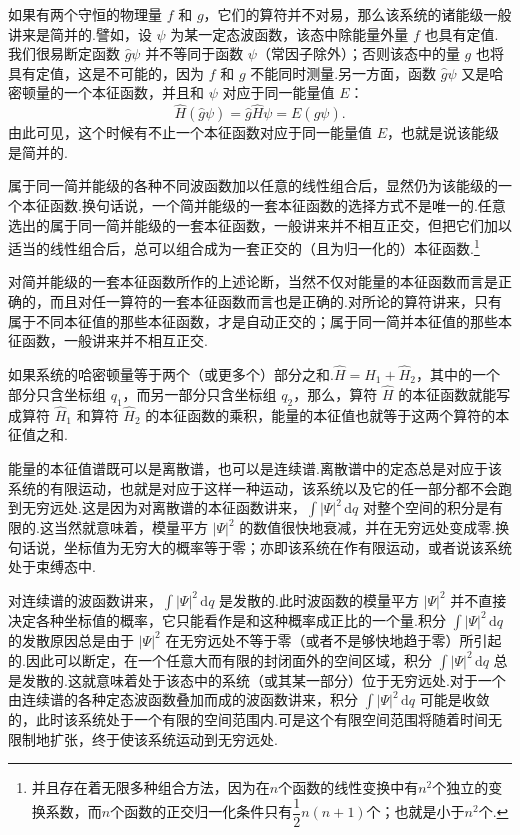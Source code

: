 如果有两个守恒的物理量 $f$ 和 $g$，它们的算符并不对易，那么该系统的诸能级一般讲来是简并的.譬如，设 $\psi$ 为某一定态波函数，该态中除能量外量 $f$ 也具有定值.我们很易断定函数 $\hat{g}\psi$ 并不等同于函数 $\psi$（常因子除外）；否则该态中的量 $g$ 也将具有定值，这是不可能的，因为 $f$ 和 $g$ 不能同时测量.另一方面，函数 $\hat{g}\psi$ 又是哈密顿量的一个本征函数，并且和 $\psi$ 对应于同一能量值 $E$：
\begin{equation*}
  \hat{H}(\hat{g}\psi)=\hat{g}\hat{H}\psi=E(\hat{g}\psi).
\end{equation*}
由此可见，这个时候有不止一个本征函数对应于同一能量值 $E$，也就是说该能级是简并的.

属于同一简并能级的各种不同波函数加以任意的线性组合后，显然仍为该能级的一个本征函数.换句话说，一个简并能级的一套本征函数的选择方式不是唯一的.任意选出的属于同一简并能级的一套本征函数，一般讲来并不相互正交，但把它们加以适当的线性组合后，总可以组合成为一套正交的（且为归一化的）本征函数.\footnote{并且存在着无限多种组合方法，因为在$n$个函数的线性变换中有$n^{2}$个独立的变换系数，而$n$个函数的正交归一化条件只有$\dfrac{1}{2}n(n+1)$个；也就是小于$n^{2}$个.}

对简并能级的一套本征函数所作的上述论断，当然不仅对能量的本征函数而言是正确的，而且对任一算符的一套本征函数而言也是正确的.对所论的算符讲来，只有属于不同本征值的那些本征函数，才是自动正交的；属于同一简并本征值的那些本征函数，一般讲来并不相互正交.

如果系统的哈密顿量等于两个（或更多个）部分之和.$\hat{H}=\hat{H}_1+\hat{H}_2$，其中的一个部分只含坐标组 $q_1$，而另一部分只含坐标组 $q_2$，那么，算符 $\hat{H}$ 的本征函数就能写成算符 $\hat{H}_1$ 和算符 $\hat{H}_2$ 的本征函数的乘积，能量的本征值也就等于这两个算符的本征值之和.

能量的本征值谱既可以是离散谱，也可以是连续谱.离散谱中的定态总是对应于该系统的有限运动，也就是对应于这样一种运动，该系统以及它的任一部分都不会跑到无穷远处.这是因为对离散谱的本征函数讲来，$\int|\varPsi|^{2}\,\mathrm{d}q$ 对整个空间的积分是有限的.这当然就意味着，模量平方 $|\varPsi|^{2}$ 的数值很快地衰减，并在无穷远处变成零.换句话说，坐标值为无穷大的概率等于零；亦即该系统在作有限运动，或者说该系统处于束缚态中.

对连续谱的波函数讲来，$\int|\varPsi|^{2}\,\mathrm{d}q$ 是发散的.此时波函数的模量平方 $|\varPsi|^{2}$ 并不直接决定各种坐标值的概率，它只能看作是和这种概率成正比的一个量.积分 $\int|\varPsi|^{2}\,\mathrm{d}q$ 的发散原因总是由于 $|\varPsi|^{2}$ 在无穷远处不等于零（或者不是够快地趋于零）所引起的.因此可以断定，在一个任意大而有限的封闭面外的空间区域，积分 $\int|\varPsi|^{2}\,\mathrm{d}q$ 总是发散的.这就意味着处于该态中的系统（或其某一部分）位于无穷远处.对于一个由连续谱的各种定态波函数叠加而成的波函数讲来，积分 $\int|\varPsi|^{2}\,\mathrm{d}q$ 可能是收敛的，此时该系统处于一个有限的空间范围内.可是这个有限空间范围将随着时间无限制地扩张，终于使该系统运动到无穷远处.

